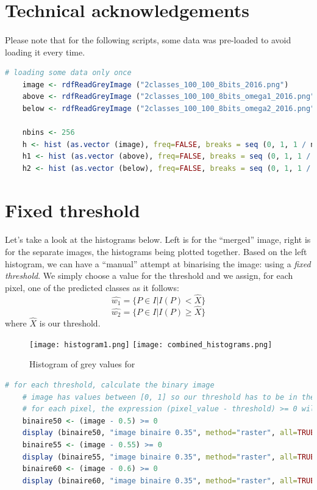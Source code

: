 \clearpage


\section{Technical acknowledgements}
\paragraph{}
Please note that for the following scripts, some data was pre-loaded to avoid loading it every time.

\begin{lstlisting}[language=R, caption=Loading some data only once]
    # loading some data only once
    image <- rdfReadGreyImage ("2classes_100_100_8bits_2016.png")
    above <- rdfReadGreyImage ("2classes_100_100_8bits_omega1_2016.png")
    below <- rdfReadGreyImage ("2classes_100_100_8bits_omega2_2016.png")

    nbins <- 256
    h <- hist (as.vector (image), freq=FALSE, breaks = seq (0, 1, 1 / nbins))
    h1 <- hist (as.vector (above), freq=FALSE, breaks = seq (0, 1, 1 / nbins))
    h2 <- hist (as.vector (below), freq=FALSE, breaks = seq (0, 1, 1 / nbins))
\end{lstlisting}

\section{Fixed threshold}
\paragraph{}
Let's take a look at the histograms below.
Left is for the ``merged'' image, right is for the separate images, the histograms being plotted together.
Based on the left histogram, we can have a ``manual'' attempt at binarising the image: using a \emph{fixed threshold}.
We simply choose a value for the threshold and we assign, for each pixel, one of the predicted classes as it follows:
$$\hat{w_1} = \{P \in I | I(P) < \hat{X}\}$$
$$\hat{w_2} = \{P \in I | I(P) \ge \hat{X}\}$$
where $\hat{X}$ is our threshold.

\begin{figure}[h]
    \centering
    \texttt{[image: histogram1.png]}
    \texttt{[image: combined\_histograms.png]}
    \caption{Histogram of grey values for}
    \label{}
\end{figure}

\begin{lstlisting}[language=R, caption=Using fixed threshold]
    # for each threshold, calculate the binary image
    # image has values between [0, 1] so our threshold has to be in the same range
    # for each pixel, the expression (pixel_value - threshold) >= 0 will assign it to one of two classes: w1 or w2
    binaire50 <- (image - 0.5) >= 0
    display (binaire50, "image binaire 0.35", method="raster", all=TRUE)
    binaire55 <- (image - 0.55) >= 0
    display (binaire55, "image binaire 0.35", method="raster", all=TRUE)
    binaire60 <- (image - 0.6) >= 0
    display (binaire60, "image binaire 0.35", method="raster", all=TRUE)
\end{lstlisting}

